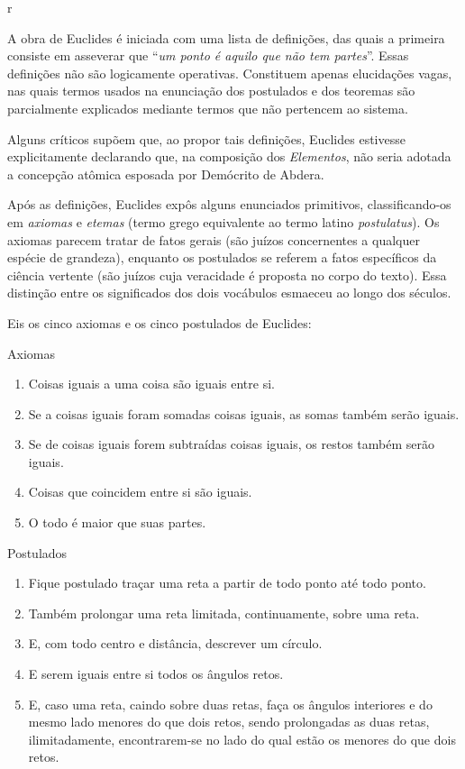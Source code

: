 r\documentclass{hipatia}
\begin{document}
A obra de Euclides é iniciada com uma lista de definições, das quais a primeira consiste em asseverar que ``\emph{um ponto é aquilo que não tem partes}''. Essas definições não são logicamente operativas. Constituem apenas elucidações vagas, nas quais termos usados na enunciação dos postulados e dos teoremas são parcialmente explicados mediante termos que não pertencem ao sistema.

Alguns críticos supõem que, ao propor tais definições, Euclides estivesse explicitamente declarando que, na composição dos \emph{Elementos}, não seria adotada a concepção atômica esposada por Demócrito de Abdera. 

Após as definições, Euclides expôs alguns enunciados primitivos, classificando-os em \emph{axiomas} e \emph{etemas}  (termo grego equivalente ao termo latino \emph{postulatus}). Os axiomas parecem tratar de fatos gerais  (são juízos concernentes a qualquer espécie de grandeza), enquanto os postulados se referem a fatos específicos da ciência vertente  (são juízos cuja veracidade é proposta no corpo do texto). Essa distinção entre os significados dos dois vocábulos esmaeceu ao longo dos séculos.

Eis os %
cinco axiomas e os cinco postulados de Euclides: 

Axiomas
\begin{enumerate}
    \item 
  Coisas iguais a uma coisa são iguais entre si.
\item  Se a coisas iguais foram somadas coisas iguais, as somas também serão iguais.
\item  Se de coisas iguais forem subtraídas coisas iguais, os restos também serão iguais.
\item  Coisas que coincidem entre si são iguais. 
\item O todo é maior que suas partes.
\end{enumerate}

Postulados

\begin{enumerate}
\item    Fique postulado traçar uma reta a partir de todo ponto até todo ponto.
\item    Também prolongar uma reta limitada, continuamente, sobre uma reta.
\item    E, com todo centro e distância, descrever um círculo.
\item     E serem iguais entre si todos os ângulos retos.
\item    E, caso uma reta, caindo sobre duas retas, faça os ângulos interiores e do mesmo lado menores do que dois retos, sendo prolongadas as duas retas, ilimitadamente, encontrarem-se no lado do qual estão os menores do que dois retos.
\end{enumerate}
\end{document}
